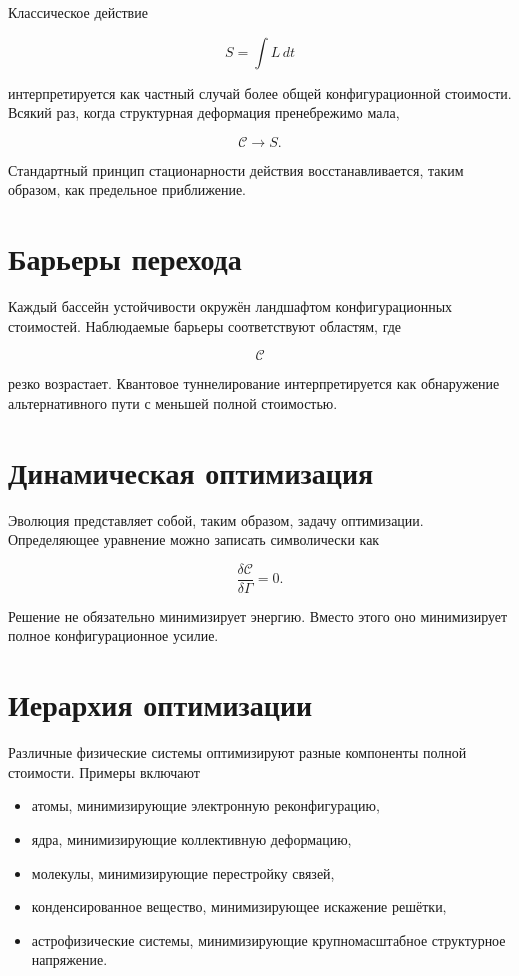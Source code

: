 Классическое действие

\[ S = \int L\,dt \]

интерпретируется как частный случай более общей конфигурационной стоимости. Всякий раз, когда структурная деформация пренебрежимо мала,

\[ \mathcal C \longrightarrow S. \]

Стандартный принцип стационарности действия восстанавливается, таким образом, как предельное приближение.

\section{Барьеры перехода}

Каждый бассейн устойчивости окружён ландшафтом конфигурационных стоимостей. Наблюдаемые барьеры соответствуют областям, где

\[ \mathcal C \]

резко возрастает. Квантовое туннелирование интерпретируется как обнаружение альтернативного пути с меньшей полной стоимостью.

\section{Динамическая оптимизация}

Эволюция представляет собой, таким образом, задачу оптимизации. Определяющее уравнение можно записать символически как

\[ \boxed{ \frac{\delta \mathcal C}{\delta\Gamma}=0. } \]

Решение не обязательно минимизирует энергию. Вместо этого оно минимизирует полное конфигурационное усилие.

\section{Иерархия оптимизации}

Различные физические системы оптимизируют разные компоненты полной стоимости. Примеры включают

\begin{itemize}

\item атомы, минимизирующие электронную реконфигурацию,

\item ядра, минимизирующие коллективную деформацию,

\item молекулы, минимизирующие перестройку связей,

\item конденсированное вещество, минимизирующее искажение решётки,

\item астрофизические системы, минимизирующие крупномасштабное структурное напряжение.

\end{itemize}

